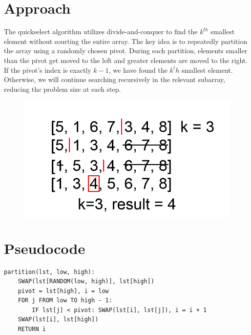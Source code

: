\documentclass{labReport}
\begin{document}
\newpage
\begin{multicols*}{2}
\raggedcolumns



\section{Approach}
The quickselect algorithm utilizes divide-and-conquer to find the $k^{th}$ smallest element without sourting the entire array. The key idea is to repeatedly partition the array using a randomly chosen pivot. During each partition, elements smaller than the pivot get moved to the left and greater elements are moved to the right. If the pivot's index is exactly $k - 1$, we have found the $k^th$ smallest element. Otherwise, we will continue searching recursively in the relevant subarray, reducing the problem size at each step. 
\begin{figure}
     \centering
     \includegraphics[width=1\linewidth]{Quickselect.png}
\end{figure} 



\section{Pseudocode}
\begin{verbatim}
partition(lst, low, high):
    SWAP(lst[RANDOM(low, high)], lst[high])
    pivot = lst[high], i = low
    FOR j FROM low TO high - 1:
        IF lst[j] < pivot: SWAP(lst[i], lst[j]), i = i + 1
    SWAP(lst[i], lst[high])
    RETURN i


\end{verbatim}
\end{multicols*}
\end{document}
